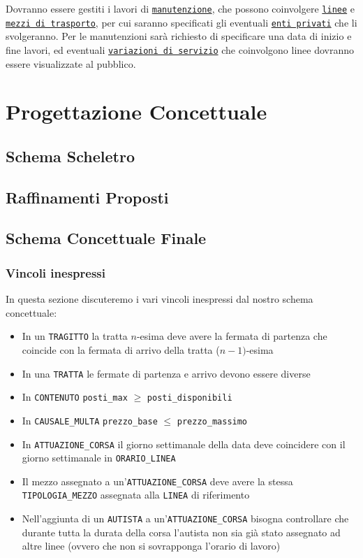 \documentclass[12pt,a4paper]{report}
\begin{document}
Dovranno essere gestiti i lavori di \underline{\texttt{manutenzione}}, che possono coinvolgere \underline{\texttt{linee}} e \underline{\texttt{mezzi di trasporto}}, per cui saranno specificati gli eventuali \underline{\texttt{enti privati}} che li svolgeranno. Per le manutenzioni sarà richiesto di specificare una data di inizio e fine lavori, ed eventuali \underline{\texttt{variazioni di servizio}} che coinvolgono linee dovranno essere visualizzate al pubblico.

\chapter{Progettazione Concettuale}
\section{Schema Scheletro}
\section{Raffinamenti Proposti}
\section{Schema Concettuale Finale}
\subsection{Vincoli inespressi}
In questa sezione discuteremo i vari vincoli inespressi dal nostro schema concettuale:
\begin{itemize}
  \item In un \texttt{TRAGITTO} la tratta $n$-esima deve avere la fermata di partenza che coincide con la fermata di arrivo della tratta ($n-1)$-esima
  \item In una \texttt{TRATTA} le fermate di partenza e arrivo devono essere diverse
  \item In \texttt{CONTENUTO} \texttt{posti\_max} $ \geq $ \texttt{posti\_disponibili}
  \item In \texttt{CAUSALE\_MULTA} \texttt{prezzo\_base} $ \leq $ \texttt{prezzo\_massimo}
  \item In \texttt{ATTUAZIONE\_CORSA} il giorno settimanale della data deve coincidere con il giorno settimanale in \texttt{ORARIO\_LINEA}
  \item Il mezzo assegnato a un'\texttt{ATTUAZIONE\_CORSA} deve avere la stessa \texttt{TIPOLOGIA\_MEZZO} assegnata alla \texttt{LINEA} di riferimento
  \item Nell'aggiunta di un \texttt{AUTISTA} a un'\texttt{ATTUAZIONE\_CORSA} bisogna controllare che durante tutta la durata della corsa l'autista non sia già stato assegnato ad altre linee (ovvero che non si sovrapponga l'orario di lavoro)
\end{itemize}
\end{document}
